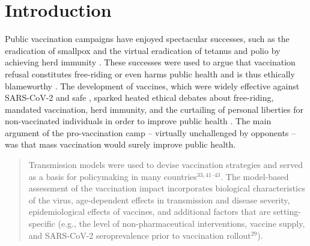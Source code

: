 \documentclass[a4paper,12pt]{article}
\begin{document}
\section{Introduction}\label{sec:Intro}
Public vaccination campaigns have enjoyed spectacular successes, such as the eradication of smallpox and the virtual eradication of tetanus and polio by achieving herd immunity \cite{Haelle2024}. These successes were used to argue that vaccination refusal constitutes free-riding or even harms public health and is thus ethically blameworthy \cite{Hoven2012,Giubilini2018}. The development of vaccines, which were widely effective against SARS-CoV-2 \cite{Altmann2022} and safe \cite{Sessa2021}, sparked heated ethical debates about free-riding, mandated vaccination, herd immunity, and the curtailing of personal liberties for non-vaccinated individuals in order to improve public health \cite{Graeber2021,Singer2021,Choy2022,ChuanVoo2022,Kelsall2024,Giubilini2020,Bernstein2023,Bradley2021,Williams2021a,Kraaijeveld2022}. The main argument of the pro-vaccination camp -- virtually unchallenged by opponents -- was that mass vaccination would surely improve public health.
\begin{quote}
Transmission models were used to devise vaccination strategies and served as a basis for policymaking in many countries$^{33,41–43}$. The model-based assessment of the vaccination impact incorporates biological characteristics of the virus, age-dependent effects in transmission and disease severity, epidemiological effects of vaccines, and additional factors that are setting-specific (e.g., the level of non-pharmaceutical interventions, vaccine supply, and SARS-CoV-2 seroprevalence prior to vaccination rollout$^{29}$). \cite[P.\ 3]{Rouzine2023} 
\end{quote}
\end{document}

